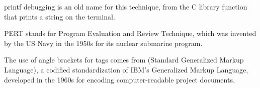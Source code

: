   \begin{sidebar}[-0.5in]{printf debugging}
    is an old name for this technique, from the C library function that
    prints a string on the terminal.
  \end{sidebar}

\begin{sidebar}{PERT}
stands for Program Evaluation and Review Technique, which was invented by the US Navy in the 1950s for its nuclear submarine program.
\end{sidebar}

\begin{sidebar}{}%
The use of angle brackets for tags
comes from  (Standard Generalized Markup Language),
a codified standardization of IBM's Generalized Markup
Language, developed  in the 1960s for encoding
computer-readable project documents.
\end{sidebar}
